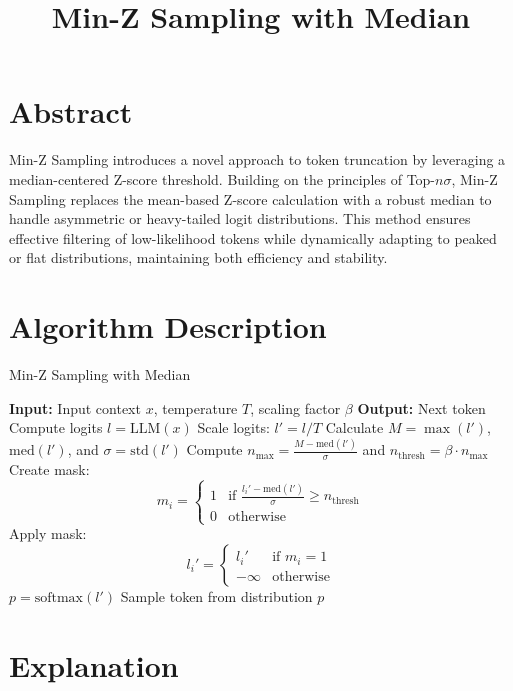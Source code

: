 \documentclass{article}
\begin{document}
\title{Min-Z Sampling with Median}
\author{}
\date{}
\maketitle

\section*{Abstract}
Min-Z Sampling introduces a novel approach to token truncation by leveraging a median-centered Z-score threshold. Building on the principles of Top-\( n\sigma \), Min-Z Sampling replaces the mean-based Z-score calculation with a robust median to handle asymmetric or heavy-tailed logit distributions. This method ensures effective filtering of low-likelihood tokens while dynamically adapting to peaked or flat distributions, maintaining both efficiency and stability.

\section*{Algorithm Description}
\begin{algorithm}[h!]
\caption{Min-Z Sampling with Median}
\begin{algorithmic}[1]
\STATE \textbf{Input:} Input context $x$, temperature $T$, scaling factor $\beta$
\STATE \textbf{Output:} Next token
\STATE Compute logits $l = \text{LLM}(x)$
\STATE Scale logits: $l' = l / T$
\STATE Calculate $M = \max(l')$, $\text{med}(l')$, and $\sigma = \text{std}(l')$
\STATE Compute $n_{\text{max}} = \frac{M - \text{med}(l')}{\sigma}$ and $n_{\text{thresh}} = \beta \cdot n_{\text{max}}$
\STATE Create mask: 
\[
m_i = 
\begin{cases} 
1 & \text{if } \frac{l_i' - \text{med}(l')}{\sigma} \geq n_{\text{thresh}} \\
0 & \text{otherwise}
\end{cases}
\]
\STATE Apply mask:
\[
l_i' = 
\begin{cases} 
l_i' & \text{if } m_i = 1 \\
-\infty & \text{otherwise}
\end{cases}
\]
\STATE $p = \text{softmax}(l')$
\STATE Sample token from distribution $p$
\end{algorithmic}
\end{algorithm}

\section*{Explanation}
\end{document}

